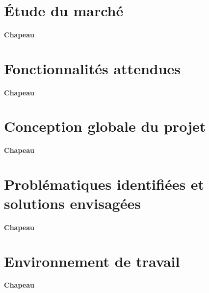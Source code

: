 \section{Étude du marché}
\label{sec:presentation_et_specification_du_proje_etude_du_marche}

\paragraph{Chapeau}


\section{Fonctionnalités attendues}
\label{sec:presentation_et_specification_du_proje_fonctionnalites _attendues}

\paragraph{Chapeau}


\section{Conception globale du projet}
\label{sec:presentation_et_specification_du_proje_conception_globale_du_projet}

\paragraph{Chapeau}


\section{Problématiques identifiées et solutions envisagées}
\label{sec:presentation_et_specification_du_proje_problématiques_identifiees_et_solutions_envisagees}

\paragraph{Chapeau}


\section{Environnement de travail}
\label{sec:presentation_et_specification_du_proje_environnement_de_travail}

\paragraph{Chapeau}